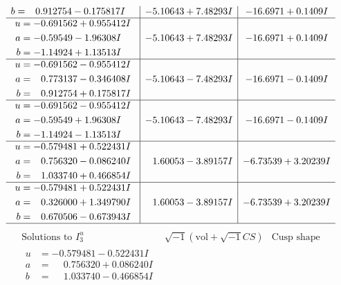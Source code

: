\documentclass[1p]{elsarticle_modified}
\theoremstyle{definition}
\newcommand{\I}{\sqrt{-1}}
\begin{document}
$$\begin{array}{c|c|c}
\begin{aligned}
b &= \phantom{-}0.912754 - 0.175817 I\end{aligned}
 & -5.10643 + 7.48293 I & -16.6971 + 0.1409 I \\ \hline\begin{aligned}
u &= -0.691562 + 0.955412 I \\
a &= -0.59549 - 1.96308 I \\
b &= -1.14924 + 1.13513 I\end{aligned}
 & -5.10643 + 7.48293 I & -16.6971 + 0.1409 I \\ \hline\begin{aligned}
u &= -0.691562 - 0.955412 I \\
a &= \phantom{-}0.773137 - 0.346408 I \\
b &= \phantom{-}0.912754 + 0.175817 I\end{aligned}
 & -5.10643 - 7.48293 I & -16.6971 - 0.1409 I \\ \hline\begin{aligned}
u &= -0.691562 - 0.955412 I \\
a &= -0.59549 + 1.96308 I \\
b &= -1.14924 - 1.13513 I\end{aligned}
 & -5.10643 - 7.48293 I & -16.6971 - 0.1409 I \\ \hline\begin{aligned}
u &= -0.579481 + 0.522431 I \\
a &= \phantom{-}0.756320 - 0.086240 I \\
b &= \phantom{-}1.033740 + 0.466854 I\end{aligned}
 & \phantom{-}1.60053 - 3.89157 I & -6.73539 + 3.20239 I \\ \hline\begin{aligned}
u &= -0.579481 + 0.522431 I \\
a &= \phantom{-}0.326000 + 1.349790 I \\
b &= \phantom{-}0.670506 - 0.673943 I\end{aligned}
 & \phantom{-}1.60053 - 3.89157 I & -6.73539 + 3.20239 I\\
 \hline 
 \end{array}$$\newpage$$\begin{array}{c|c|c}  
\text{Solutions to }I^u_{3}& \I (\text{vol} + \sqrt{-1}CS) & \text{Cusp shape}\\
 \hline 
\begin{aligned}
u &= -0.579481 - 0.522431 I \\
a &= \phantom{-}0.756320 + 0.086240 I \\
b &= \phantom{-}1.033740 - 0.466854 I\end{aligned}

\end{array}$$
\end{document}
